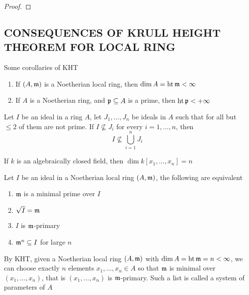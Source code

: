 \begin{proof}
\end{proof}

\subsection{CONSEQUENCES OF KRULL HEIGHT THEOREM FOR LOCAL RING}

\begin{corollary}
	Some corollaries of KHT
	\begin{enumerate}
		\item If $(A, \mathfrak{m})$ is a Noetherian local ring, then $\dim A = \operatorname{ht} \mathfrak{m} < \infty$
		\item If $A$ is a Noetherian ring, and $\mathfrak{p} \subseteq A$ is a prime, then $\operatorname{ht} \mathfrak{p} < +\infty$
	\end{enumerate}
\end{corollary}

\begin{lemma}
	Let $I$ be an ideal in a ring $A$, let $J_1, ..., J_n$ be ideals in $A$ such that for all but $\leq 2$ of them are not prime. If $I \nsubseteq J_i$ for every $i=1, ..., n$, then
	$$
		I \nsubseteq \bigcup_{i=1}^n J_i
	$$ 
\end{lemma}

\begin{corollary}
	If $k$ is an algebraically closed field, then $\dim k[x_1, ..., x_n] = n$
\end{corollary}

\begin{proposition}
	Let $I$ be an ideal in a Noetherian local ring $(A, \mathfrak{m})$, the following are equivalent
	\begin{enumerate}
		\item $\mathfrak{m}$ is a minimal prime over $I$
		\item $\sqrt{I} = \mathfrak{m}$
		\item $I$ is $\mathfrak{m}$-primary
		\item $\mathfrak{m}^n \subseteq I$ for large $n$
	\end{enumerate}
\end{proposition}


\begin{definition}
	By KHT, given a Noetherian local ring $(A, \mathfrak{m})$ with $\dim A = \operatorname{ht} \mathfrak{m} = n < \infty$, we can choose exactly $n$ elements $x_1, ..., x_n \in A$ so that $\mathfrak{m}$ is minimal over $(x_1, ..., x_n)$, that is $(x_1, ..., x_n)$ is $\mathfrak{m}$-primary. Such a list is called a system of parameters of $A$
\end{definition}

